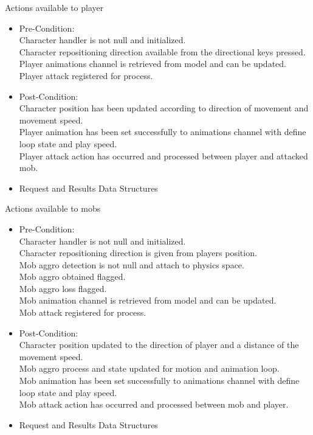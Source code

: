 \documentclass[letterpaper]{article}
\begin{document}
					\vspace{0.1in}
					Actions available to player
					\begin{itemize}
						\item Pre-Condition: \\
							Character handler is not null and initialized. \\
							Character repositioning direction available from the directional keys pressed. \\
							Player animations channel is retrieved from model and can be updated. \\
							Player attack registered for process.
						\item Post-Condition: \\
							Character position has been updated according to direction of movement and movement speed. \\
							Player animation has been set successfully to animations channel with define loop state and play speed. \\
							Player attack action has occurred and processed between player and attacked mob.
						\item Request and Results Data Structures \\
							
					\end{itemize}
					
					\vspace{0.1in}
					Actions available to mobs
					\begin{itemize}
						\item Pre-Condition: \\
							Character handler is not null and initialized. \\
							Character repositioning direction is given from players position. \\
							Mob aggro detection is not null and attach to physics space. \\
							Mob aggro obtained flagged. \\
							Mob aggro loss flagged. \\
							Mob animation channel is retrieved from model and can be updated. \\
							Mob attack registered for process.
						\item Post-Condition: \\
							Character position updated to the direction of player and a distance of the movement speed. \\
							Mob aggro process and state updated for motion and animation loop. \\
							Mob animation has been set successfully to animations channel with define loop state and play speed. \\
							Mob attack action has occurred and processed between mob and player.
						\item Request and Results Data Structures \\
						
					\end{itemize}
					
\end{document}
